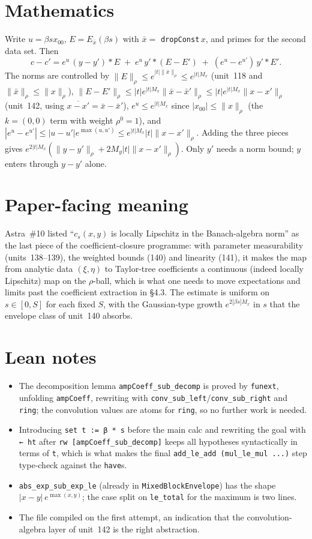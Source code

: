 \documentclass[11pt]{article}
\begin{document}
\section{Mathematics}
Write $u=\beta s x_{00}$, $E=E_{\bar x}(\beta s)$ with $\bar x=$ \texttt{dropConst}$\,x$, and
primes for the second data set. Then
\[
c-c'=e^{u}\,(y-y')*E\;+\;e^{u}\,y'*(E-E')\;+\;(e^{u}-e^{u'})\,y'*E'.
\]
The norms are controlled by $\|E\|_\rho\le e^{|t|\|\bar x\|_\rho}\le e^{|t|M_x}$ (unit~118 and
$\|\bar x\|_\rho\le\|x\|_\rho$), $\|E-E'\|_\rho\le|t|e^{|t|M_x}\|\bar x-\bar x'\|_\rho\le
|t|e^{|t|M_x}\|x-x'\|_\rho$ (unit~142, using $\overline{x-x'}=\bar x-\bar x'$), $e^{u}\le
e^{|t|M_x}$ since $|x_{00}|\le\|x\|_\rho$ (the $k=(0,0)$ term with weight $\rho^0=1$), and
$|e^u-e^{u'}|\le|u-u'|e^{\max(u,u')}\le e^{|t|M_x}|t|\|x-x'\|_\rho$. Adding the three pieces gives
$e^{2|t|M_x}(\|y-y'\|_\rho+2M_y|t|\|x-x'\|_\rho)$. Only $y'$ needs a norm bound; $y$ enters through
$y-y'$ alone.

\section{Paper-facing meaning}
Astra~\#10 listed ``$c_s(x,y)$ is locally Lipschitz in the Banach-algebra norm'' as the last piece of
the coefficient-closure programme: with parameter measurability (units~138--139), the weighted
bounds (140) and linearity (141), it makes the map from analytic data $(\xi,\eta)$ to Taylor-tree
coefficients a continuous (indeed locally Lipschitz) map on the $\rho$-ball, which is what one
needs to move expectations and limits past the coefficient extraction in §4.3. The estimate is
uniform on $s\in[0,S]$ for each fixed $S$, with the Gaussian-type growth $e^{2|\beta s|M_x}$ in $s$
that the envelope class of unit~140 absorbs.

\section{Lean notes}
\begin{itemize}
\item The decomposition lemma \texttt{ampCoeff\_sub\_decomp} is proved by \texttt{funext},
unfolding \texttt{ampCoeff}, rewriting with \texttt{conv\_sub\_left}/\texttt{conv\_sub\_right} and
\texttt{ring}; the convolution values are atoms for \texttt{ring}, so no further work is needed.
\item Introducing \texttt{set t := β * s} before the main calc and rewriting the goal with
\texttt{← ht} after \texttt{rw [ampCoeff\_sub\_decomp]} keeps all hypotheses syntactically in
terms of \texttt{t}, which is what makes the final \texttt{add\_le\_add (mul\_le\_mul ...)} step
type-check against the \texttt{have}s.
\item \texttt{abs\_exp\_sub\_exp\_le} (already in \texttt{MixedBlockEnvelope}) has the shape
$|x-y|\,e^{\max(x,y)}$; the case split on \texttt{le\_total} for the maximum is two lines.
\item The file compiled on the first attempt, an indication that the convolution-algebra layer of
unit~142 is the right abstraction.
\end{itemize}
\end{document}

